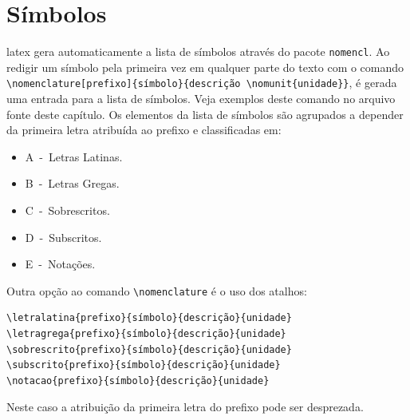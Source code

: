 \section{Símbolos}\label{sec:simbolos}

\gls{latex} gera automaticamente a lista de símbolos através do pacote \texttt{nomencl}. Ao redigir um símbolo pela primeira vez em qualquer parte do texto com o comando \verb|\nomenclature[prefixo]{símbolo}{descrição \nomunit{unidade}}|, é gerada uma entrada para a lista de símbolos. Veja exemplos deste comando no arquivo fonte deste capítulo. Os elementos da lista de símbolos são agrupados a depender da primeira letra atribuída ao prefixo e classificadas em:

\begin{itemize}%
\item A~-~Letras Latinas.
\item B~-~Letras Gregas.
\item C~-~Sobrescritos.
\item D~-~Subscritos.
\item E~-~Notações.
\end{itemize}

Outra opção ao comando \verb|\nomenclature| é o uso dos atalhos:

\begin{SingleSpacing}%
\begin{verbatim}
\letralatina{prefixo}{símbolo}{descrição}{unidade}
\letragrega{prefixo}{símbolo}{descrição}{unidade}
\sobrescrito{prefixo}{símbolo}{descrição}{unidade}
\subscrito{prefixo}{símbolo}{descrição}{unidade}
\notacao{prefixo}{símbolo}{descrição}{unidade}
\end{verbatim}
\end{SingleSpacing}

\noindent Neste caso a atribuição da primeira letra do prefixo pode ser desprezada.


